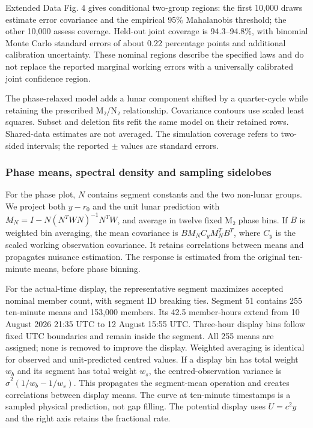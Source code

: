 \documentclass[
  12pt,
  a4paper,
]{article}
\begin{document}
Extended Data Fig. 4 gives conditional two-group regions: the first
10,000 draws estimate error covariance and the empirical 95\%
Mahalanobis threshold; the other 10,000 assess coverage. Held-out joint
coverage is 94.3--94.8\%, with binomial Monte Carlo standard errors of
about 0.22 percentage points and additional calibration uncertainty.
These nominal regions describe the specified laws and do not replace the
reported marginal working errors with a universally calibrated joint
confidence region.

The phase-relaxed model adds a lunar component shifted by a
quarter-cycle while retaining the prescribed M₂/N₂ relationship.
Covariance contours use scaled least squares. Subset and deletion fits
refit the same model on their retained rows. Shared-data estimates are
not averaged. The simulation coverage refers to two-sided intervals; the
reported \(\pm\) values are standard errors.

\hypertarget{phase-means-spectral-density-and-sampling-sidelobes}{%
\subsubsection{Phase means, spectral density and sampling
sidelobes}\label{phase-means-spectral-density-and-sampling-sidelobes}}

For the phase plot, \(N\) contains segment constants and the two
non-lunar groups. We project both \(y-r_0\) and the unit lunar
prediction with \(M_N=I-N(N^TWN)^{-1}N^TW\), and average in twelve fixed
M₂ phase bins. If \(B\) is weighted bin averaging, the mean covariance
is \(BM_NC_yM_N^TB^T\), where \(C_y\) is the scaled working observation
covariance. It retains correlations between means and propagates
nuisance estimation. The response is estimated from the original
ten-minute means, before phase binning.

For the actual-time display, the representative segment maximizes
accepted nominal member count, with segment ID breaking ties. Segment 51
contains 255 ten-minute means and 153,000 members. Its 42.5 member-hours
extend from 10 August 2026 21:35 UTC to 12 August 15:55 UTC. Three-hour
display bins follow fixed UTC boundaries and remain inside the segment.
All 255 means are assigned; none is removed to improve the display.
Weighted averaging is identical for observed and unit-predicted centred
values. If a display bin has total weight \(w_b\) and its segment has
total weight \(w_s\), the centred-observation variance is
\(\widehat\sigma^2(1/w_b-1/w_s)\). This propagates the segment-mean
operation and creates correlations between display means. The curve at
ten-minute timestamps is a sampled physical prediction, not gap filling.
The potential display uses \(U=c^2y\) and the right axis retains the
fractional rate.
\end{document}
